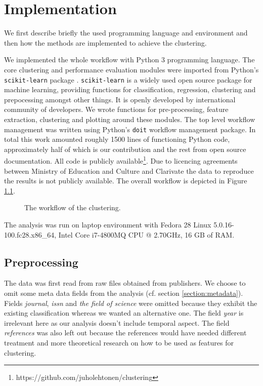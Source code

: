 \chapter{Implementation}
\label{chapter:implementation}


We first describe briefly the used programming language and 
environment and then how the methods are implemented to achieve the 
clustering. 

We implemented the whole workflow with Python 3 programming 
language. The core clustering and performance evaluation modules
were imported from Python's \texttt{scikit-learn} package 
\cite{scikit-learn}. \texttt{scikit-learn} is a widely used open 
source package for machine learning, providing functions for 
classification, regression, clustering and prepocessing amongst 
other things. It is openly developed by international community of
developers. We wrote functions for pre-processing, feature 
extraction, clustering and plotting around these modules. 
The top level workflow management was written using Python's 
\texttt{doit} workflow management package. In total this work 
amounted roughly 1500 lines of functioning Python code, 
approximately half of which is our contribution and the rest from 
open source documentation. All code is publicly 
available\footnote{https://github.com/juholehtonen/clustering}. 
Due to licencing agreements between Ministry of Education and 
Culture and Clarivate the data to reproduce the results is not 
publicly available. The overall workflow is depicted in Figure 
\ref{fig:wf}.

\begin{figure}[ht]
  \begin{center}    
    
    \caption{The workflow of the clustering.}
    \label{fig:wf}
  \end{center}
\end{figure}

The analysis was run on laptop environment with Fedora 28 Linux 
5.0.16-100.fc28.x86\_64, Intel Core i7-4800MQ CPU @ 2.70GHz, 16 GB
of RAM.

\section{Preprocessing}
\label{sec:impl_preproc}
The data was first read from raw files obtained from publishers. 
We choose to omit some meta data fields from the analysis (cf. 
section \ref{section:metadata}). Fields \emph{journal}, 
\emph{issn} and \emph{the field of science} were omitted because 
they exhibit the existing classification whereas we wanted an 
alternative one. The field \emph{year} is irrelevant here as our 
analysis doesn't include temporal aspect. The field 
\emph{references} was also left out because the references 
would have needed different treatment and more theoretical research 
on how to be used as features for clustering.

